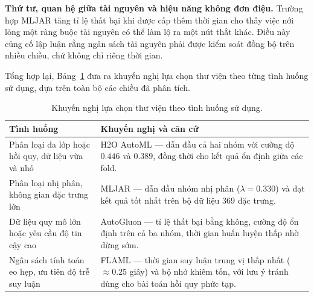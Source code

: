 \textbf{Thứ tư, quan hệ giữa tài nguyên và hiệu năng không đơn điệu.} Trường hợp
MLJAR tăng tỉ lệ thất bại khi được cấp thêm thời gian cho thấy việc nới lỏng một
ràng buộc tài nguyên có thể làm lộ ra một nút thắt khác. Điều này củng cố lập luận
rằng ngân sách tài nguyên phải được kiểm soát đồng bộ trên nhiều chiều, chứ không
chỉ riêng thời gian.

Tổng hợp lại, Bảng~\ref{tab:khuyennghi} đưa ra khuyến nghị lựa chọn thư viện theo
từng tình huống sử dụng, dựa trên toàn bộ các chiều đã phân tích.

\begin{table}[H]
  \centering
  \small
  \caption{Khuyến nghị lựa chọn thư viện theo tình huống sử dụng.}
  \label{tab:khuyennghi}
  \renewcommand{\arraystretch}{1.25}
  \begin{tabularx}{\linewidth}{@{}l X@{}}
    \toprule
    \textbf{Tình huống} & \textbf{Khuyến nghị và căn cứ} \\
    \midrule
    Phân loại đa lớp hoặc hồi quy, dữ liệu vừa và nhỏ &
    H2O AutoML --- dẫn đầu cả hai nhóm với cường độ $0.446$ và $0.389$, đồng thời
    cho kết quả ổn định giữa các fold. \\
    Phân loại nhị phân, không gian đặc trưng lớn &
    MLJAR --- dẫn đầu nhóm nhị phân ($\lambda = 0.330$) và đạt kết quả tốt nhất
    trên bộ dữ liệu 369 đặc trưng. \\
    Dữ liệu quy mô lớn hoặc yêu cầu độ tin cậy cao &
    AutoGluon --- tỉ lệ thất bại bằng không, cường độ ổn định trên cả ba nhóm,
    thời gian huấn luyện thấp nhờ dừng sớm. \\
    Ngân sách tính toán eo hẹp, ưu tiên độ trễ suy luận &
    FLAML --- thời gian suy luận trung vị thấp nhất ($\approx 0.25$ giây) và bộ
    nhớ khiêm tốn, với lưu ý tránh dùng cho bài toán hồi quy phức tạp. \\
    \bottomrule
  \end{tabularx}
\end{table}

